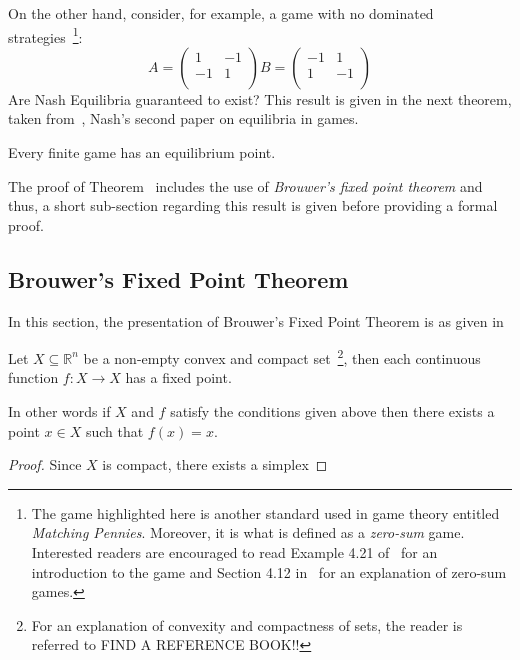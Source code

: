 On the other hand, consider, for example, a game with no dominated
strategies~\footnote{The game highlighted here is another standard used in game
theory entitled \emph{Matching Pennies}. Moreover, it is what is defined as a
\emph{zero-sum} game. Interested readers are encouraged to read Example 4.21
of~\cite{Webb2007} for an introduction to the game and Section 4.12
in~\cite{maschler_solan_zamir_2013} for an explanation of zero-sum games.}:
\[
    A =
    \begin{pmatrix}
        1 & -1\\
        -1 & 1\\
    \end{pmatrix}

    B =
    \begin{pmatrix}
        -1 & 1\\
        1 & -1\\
    \end{pmatrix}
\]
Are Nash Equilibria guaranteed to exist? This result is given in the next
theorem, taken from~\cite{nash1951non}, Nash's second paper on equilibria in games.

\begin{theorem}\label{thm:Nash}
    Every finite game has an equilibrium point.
\end{theorem}

The proof of Theorem~\label{thm:Nash} includes the use of \emph{Brouwer's fixed
point theorem} and thus, a short sub-section regarding this result is given
before providing a formal proof.

\subsection{Brouwer's Fixed Point Theorem}\label{subsec:Brouwer_thm}
In this section, the presentation of Brouwer's Fixed Point Theorem is as given in~\cite{maschler_solan_zamir_2013}
\begin{theorem}\label{thm:Brouwer}
    Let \(X \subseteq \mathbb{R}^{n}\) be a non-empty convex and compact
    set~\footnote{For an explanation of convexity and compactness of sets, the
    reader is referred to FIND A REFERENCE BOOK!!},
    then each continuous function \(f : X \to X\) has a fixed point.  
\end{theorem}
In other words if \(X\) and \(f\) satisfy the conditions given above then there
exists a point \(x \in X\) such that \(f(x) = x\). 

\begin{proof}
    Since \(X\) is compact, there exists a simplex 
\end{proof}

